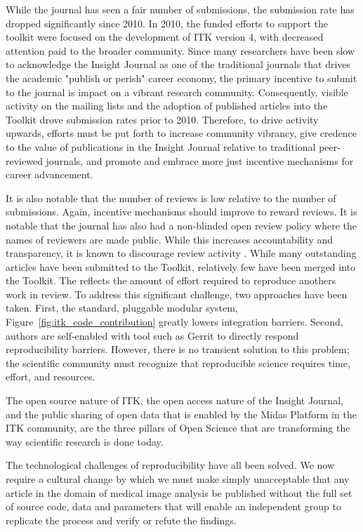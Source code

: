 \documentclass{frontiersENG} %
\begin{document}
While the journal has seen a fair number of submissions, the submission rate
has dropped significantly since 2010. In 2010, the funded efforts to support
the toolkit were focused on the development of ITK version 4, with decreased
attention paid to the broader community.  Since many researchers have been
slow to acknowledge the Insight Journal as one of the traditional journals
that drives the academic "publish or perish" career economy, the primary
incentive to submit to the journal is impact on a vibrant research community.
Consequently, visible activity on the mailing lists and the adoption of published
articles into the Toolkit drove submission rates prior to 2010. Therefore, to
drive activity upwards, efforts must be put forth to increase community
vibrancy, give credence to the value of publications in the Insight Journal
relative to traditional peer-reviewed journals, and promote and embrace more
just incentive mechanisms for career advancement.

It is also notable that the number of reviews is low relative to the number of
submissions. Again, incentive mechanisms should improve to reward reviews.  It
is notable that the journal has also had a non-blinded open review policy
where the names of reviewers are made public. While this increases
accountability and transparency, it is known to discourage review activity
\cite{Rooyen1999,Walsh2000}. While many outstanding articles have been
submitted to the Toolkit, relatively few have been merged into the Toolkit.
The reflects the amount of effort required to reproduce anothers work in
review.  To address this significant challenge, two approaches have been
taken.  First, the standard, pluggable modular system,
Figure~\ref{fig:itk_code_contribution} greatly lowers integration barriers.
Second, authors are self-enabled with tool such as Gerrit to directly respond
reproducibility barriers. However, there is no transient solution to this
problem; the scientific community must recognize that reproducible science
requires time, effort, and resources.

The open source nature of ITK, the open access nature of the Insight Journal,
and the public sharing of open data that is enabled by the Midas Platform in
the ITK community, are the three pillars of Open Science that are transforming
the way scientific research is done today.

The technological challenges of reproducibility have all been solved. We now
require a cultural change by which we must make simply unacceptable that any
article in the domain of medical image analysis be published without the full
set of source code, data and parameters that will enable an independent group
to replicate the process and verify or refute the findings.
\end{document}
